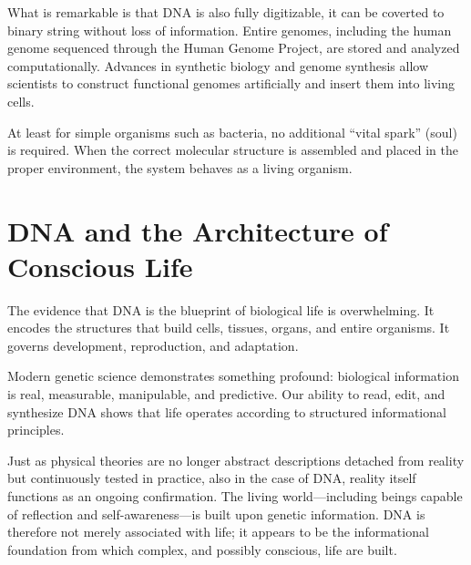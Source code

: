 What is remarkable is that DNA is also fully digitizable, it can be coverted to binary string without loss of information.
Entire genomes, including the human genome sequenced through the Human Genome Project, are stored and analyzed computationally. 
Advances in synthetic biology and genome synthesis allow scientists to construct functional genomes artificially and insert them into living cells.

At least for simple organisms such as bacteria, no additional “vital spark” (soul) is required. 
When the correct molecular structure is assembled and placed in the proper environment, the system behaves as a living organism.


\section*{DNA and the Architecture of Conscious Life}

The evidence that DNA is the blueprint of biological life is overwhelming. It encodes the structures that build cells, tissues, organs, and entire organisms. 
It governs development, reproduction, and adaptation.

Modern genetic science demonstrates something profound: biological information is real, measurable, manipulable, and predictive. 
Our ability to read, edit, and synthesize DNA shows that life operates according to structured informational principles. 

Just as physical theories are no longer abstract descriptions detached from reality but continuously tested in practice, also in the case of DNA, reality itself functions as an ongoing confirmation.
The living world—including beings capable of reflection and self-awareness—is built upon genetic information.
DNA is therefore not merely associated with life; it appears to be the informational foundation from which complex, and possibly conscious, life are built. 
